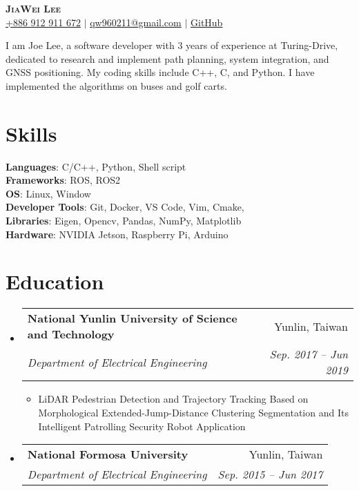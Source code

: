 \documentclass[letterpaper,11pt]{article}
\makeatletter
\newcommand{\resumeItem}[1]{
  \item\small{
    {#1 \vspace{-2pt}}
  }
}
\newcommand{\resumeSubheading}[4]{
  \vspace{-2pt}\item
    \begin{tabular*}{0.97\textwidth}[t]{l@{\extracolsep{\fill}}r}
      \textbf{#1} & #2 \\
      \textit{\small#3} & \textit{\small #4} \\
    \end{tabular*}\vspace{-7pt}
}
\newcommand{\resumeSubHeadingListStart}{\begin{itemize}[leftmargin=0.15in, label={}]}
\newcommand{\resumeSubHeadingListEnd}{\end{itemize}}
\newcommand{\resumeItemListStart}{\begin{itemize}}
\newcommand{\resumeItemListEnd}{\end{itemize}\vspace{-5pt}}
\makeatother
\begin{document}
\begin{center}
    \textbf{\Huge \scshape JiaWei Lee} \\ \vspace{3pt}
    \faMobile \hspace{.5pt} \href{tel:0912911672}{\color{blue}+886 912 911 672} $|$
    \faAt \hspace{.5pt} \href{mailto:qw960211@gmail.com}{\color{blue}qw960211@gmail.com} $|$
    \faGithub \hspace{.5pt} \href{https://github.com/EC404}{\color{blue}GitHub}
\end{center}

{I am Joe Lee, a software developer with 3 years of experience at Turing-Drive, dedicated to research and implement path planning, system integration, and GNSS positioning. My coding skills include C++, C, and Python. I have implemented the algorithms on buses and golf carts.} \\

\section{\textbf{Skills}}
 \begin{itemize}[leftmargin=0.15in, label={}]
    \small{\item{
     \textbf{Languages}{: C/C++, Python, Shell script} \\
     \textbf{Frameworks}{: ROS, ROS2} \\
     \textbf{OS}{: Linux, Window} \\
     \textbf{Developer Tools}{: Git, Docker, VS Code, Vim, Cmake, } \\
     \textbf{Libraries}{: Eigen, Opencv, Pandas, NumPy, Matplotlib} \\
     \textbf{Hardware}{: NVIDIA Jetson, Raspberry Pi, Arduino}
    }}
 \end{itemize}

\section{\textbf{Education}}
  \vspace{3pt}
  \resumeSubHeadingListStart
    \resumeSubheading
      {National Yunlin University of  Science and Technology}{Yunlin, Taiwan}
      {Department of Electrical Engineering}{Sep. 2017 -- Jun 2019}
      \resumeItemListStart
        \resumeItem{LiDAR Pedestrian Detection and Trajectory Tracking Based on Morphological Extended-Jump-Distance  Clustering Segmentation and Its Intelligent Patrolling  Security Robot Application}
      \resumeItemListEnd
    \resumeSubheading
      {National Formosa University}{Yunlin, Taiwan}
      {Department of Electrical Engineering}{Sep. 2015 -- Jun 2017}
  \resumeSubHeadingListEnd
\end{document}
